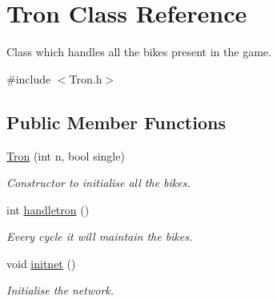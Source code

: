 \hypertarget{class_tron}{\section{Tron Class Reference}
\label{class_tron}
}


Class which handles all the bikes present in the game.  




{\ttfamily \#include $<$Tron.\-h$>$}

\subsection*{Public Member Functions}
\begin{DoxyCompactItemize}
\item 
\hypertarget{class_tron_a0427d3ba4e5f081ea7911e79a7e0e96b}{\hyperlink{class_tron_a0427d3ba4e5f081ea7911e79a7e0e96b}{Tron} (int n, bool single)}\label{class_tron_a0427d3ba4e5f081ea7911e79a7e0e96b}

\begin{DoxyCompactList}\small\item\em Constructor to initialise all the bikes. \end{DoxyCompactList}\item 
\hypertarget{class_tron_a0a71b76767f283ce0223e8a1530ef284}{int \hyperlink{class_tron_a0a71b76767f283ce0223e8a1530ef284}{handletron} ()}\label{class_tron_a0a71b76767f283ce0223e8a1530ef284}

\begin{DoxyCompactList}\small\item\em Every cycle it will maintain the bikes. \end{DoxyCompactList}\item 
\hypertarget{class_tron_a7ad9f71aeb3387d5710471ee81b2cb33}{void \hyperlink{class_tron_a7ad9f71aeb3387d5710471ee81b2cb33}{initnet} ()}\label{class_tron_a7ad9f71aeb3387d5710471ee81b2cb33}

\begin{DoxyCompactList}\small\item\em Initialise the network. \end{DoxyCompactList}\end{DoxyCompactItemize}
